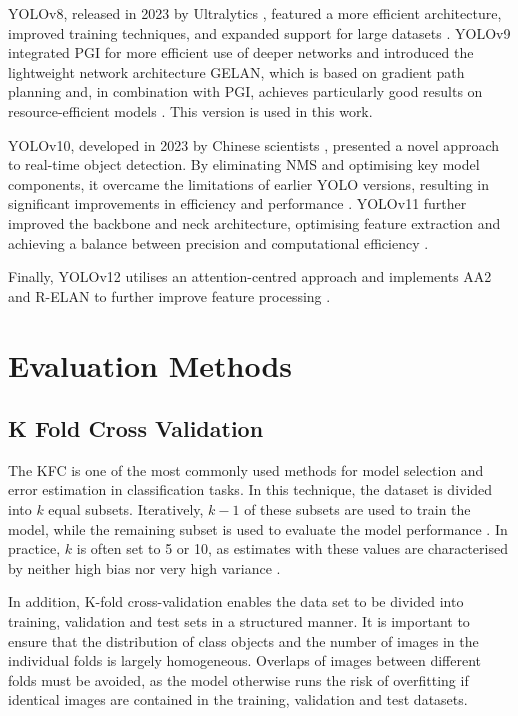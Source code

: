 YOLOv8, released in 2023 by Ultralytics \cite{ultralyics_2023}, featured a more efficient architecture, improved training techniques, and expanded support for large datasets \cite{Sapkota2025,ultralyics_2023}. YOLOv9 \cite{wang2024_sapkota} integrated \acrfull{PGI} for more efficient use of deeper networks and introduced the lightweight network architecture \acrfull{GELAN}, which is based on gradient path planning and, in combination with \acrshort{PGI}, achieves particularly good results on resource-efficient models \cite {Sapkota2025,wang2024_sapkota,wang2024}. This version is used in this work.

YOLOv10, developed in 2023 by Chinese scientists \cite{wang2024_yolov10}, presented a novel approach to real-time object detection. By eliminating \acrfull{NMS} and optimising key model components, it overcame the limitations of earlier YOLO versions, resulting in significant improvements in efficiency and performance \cite{wang2024_yolov10}. YOLOv11 further improved the backbone and neck architecture, optimising feature extraction and achieving a balance between precision and computational efficiency \cite{Sapkota2025,ultralyics_yolov11}.

Finally, YOLOv12 utilises an attention-centred approach and implements \acrfull{AA2} and \acrfull{R-ELAN} to further improve feature processing \cite{tian2025,Sapkota2025,yolo12}.


\section{Evaluation Methods}
\subsection{K Fold Cross Validation}

The \acrfull{KFC} is one of the most commonly used methods for model selection and error estimation in classification tasks. In this technique, the dataset is divided into $k$ equal subsets. Iteratively, $k-1$ of these subsets are used to train the model, while the remaining subset is used to evaluate the model performance \cite{Anguita2012}. In practice, $k$ is often set to 5 or 10, as estimates with these values are characterised by neither high bias nor very high variance \cite{Nti2021}.
 
In addition, K-fold cross-validation enables the data set to be divided into training, validation and test sets in a structured manner. It is important to ensure that the distribution of class objects and the number of images in the individual folds is largely homogeneous. Overlaps of images between different folds must be avoided, as the model otherwise runs the risk of overfitting if identical images are contained in the training, validation and test datasets.




